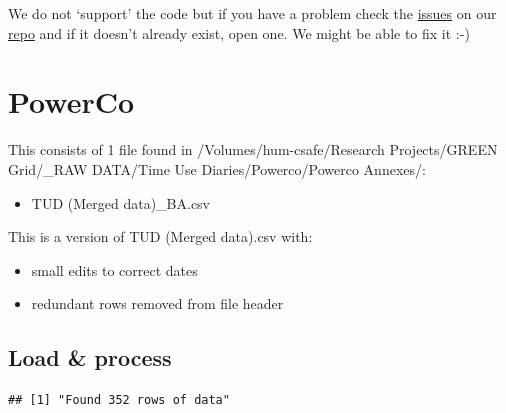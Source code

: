 \documentclass[]{article}
\providecommand{\tightlist}{%
  \setlength{\itemsep}{0pt}\setlength{\parskip}{0pt}}
\begin{document}
We do not `support' the code but if you have a problem check the
\href{https://git.soton.ac.uk/ba1e12/nzGREENGrid/issues}{issues} on our
\href{https://git.soton.ac.uk/ba1e12/nzGREENGrid}{repo} and if it
doesn't already exist, open one. We might be able to fix it :-)

\section{PowerCo}\label{powerco}

This consists of 1 file found in /Volumes/hum-csafe/Research
Projects/GREEN Grid/\_RAW DATA/Time Use Diaries/Powerco/Powerco
Annexes/:

\begin{itemize}
\tightlist
\item
  TUD (Merged data)\_BA.csv
\end{itemize}

This is a version of TUD (Merged data).csv with:

\begin{itemize}
\tightlist
\item
  small edits to correct dates
\item
  redundant rows removed from file header
\end{itemize}

\subsection{Load \& process}\label{load-process}

\begin{verbatim}
## [1] "Found 352 rows of data"
\end{verbatim}
\end{document}
